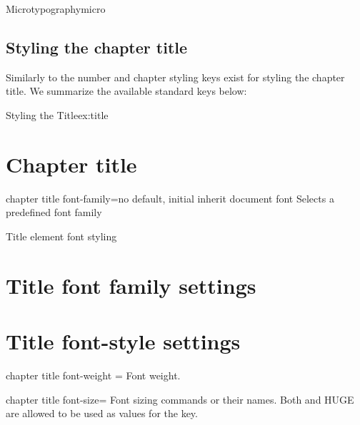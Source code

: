 \begin{decription}
{\begin{texexample}{Microtypography}{micro}
\egroup
\end{texexample}


\hbox{}

\hbox{}


\section{Styling the chapter title}

Similarly to the number and chapter styling keys exist for styling the chapter title. We summarize the available standard keys below:

\begin{texexample}{Styling the Title}{ex:title} 
\chapter{Chapter title}
\lorem
\end{texexample}


\begin{docKey}[phd]{chapter title font-family}{=}{no default, initial inherit document font}
Selects a predefined font family
\end{docKey}

\begin{texexample}{Title element font styling}{}
\chapter{Title font family settings}
\lorem
{}
\chapter{Title font-style settings}
\lorem
\end{texexample}


\begin{docKey}[phd]{chapter title font-weight}{ = } {}
Font weight.
\end{docKey}

\begin{docKey}[phd]{chapter title font-size}{= }{}
Font sizing commands or their names. Both \docAuxCommand{\HUGE} and HUGE are allowed to be used as values for the key.
\end{docKey}

}
\end{decription}
